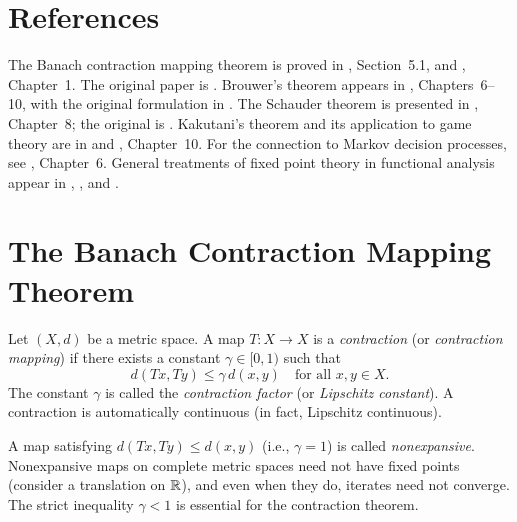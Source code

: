 \documentclass[11pt,a4paper]{article}
\begin{document}

\section{References}
\label{sec:references}

The Banach contraction mapping theorem is proved in
\citet{kreyszig1989}, Section~5.1, and \citet{granas2003}, Chapter~1.
The original paper is \citet{banach1922}.  Brouwer's theorem appears
in \citet{granas2003}, Chapters~6--10, with the original formulation
in \citet{brouwer1911}.  The Schauder theorem is presented in
\citet{granas2003}, Chapter~8; the original is
\citet{schauder1930}.  Kakutani's theorem and its application to game
theory are in \citet{kakutani1941} and \citet{granas2003},
Chapter~10.  For the connection to Markov decision processes, see
\citet{puterman2014}, Chapter~6.  General treatments of fixed point
theory in functional analysis appear in \citet{brezis2011},
\citet{rudin1991}, and \citet{dunford1988}.


\section{The Banach Contraction Mapping Theorem}
\label{sec:banach}

\begin{definition}
\label{def:contraction}
Let $(X, d)$ be a metric space.  A map $T \colon X \to X$ is a
\emph{contraction} (or \emph{contraction mapping}) if there exists a
constant $\gamma \in [0, 1)$ such that
\[
    d(Tx, Ty) \leq \gamma \, d(x, y)
    \quad \text{for all } x, y \in X.
\]
The constant $\gamma$ is called the \emph{contraction factor}
(or \emph{Lipschitz constant}).  A contraction is automatically
continuous (in fact, Lipschitz continuous).
\end{definition}

\begin{remark}
\label{rem:nonexpansive}
A map satisfying $d(Tx, Ty) \leq d(x, y)$ (i.e., $\gamma = 1$) is
called \emph{nonexpansive}.  Nonexpansive maps on complete metric
spaces need not have fixed points (consider a translation on $\mathbb{R}$),
and even when they do, iterates need not converge.  The strict
inequality $\gamma < 1$ is essential for the contraction theorem.
\end{remark}
\end{document}
